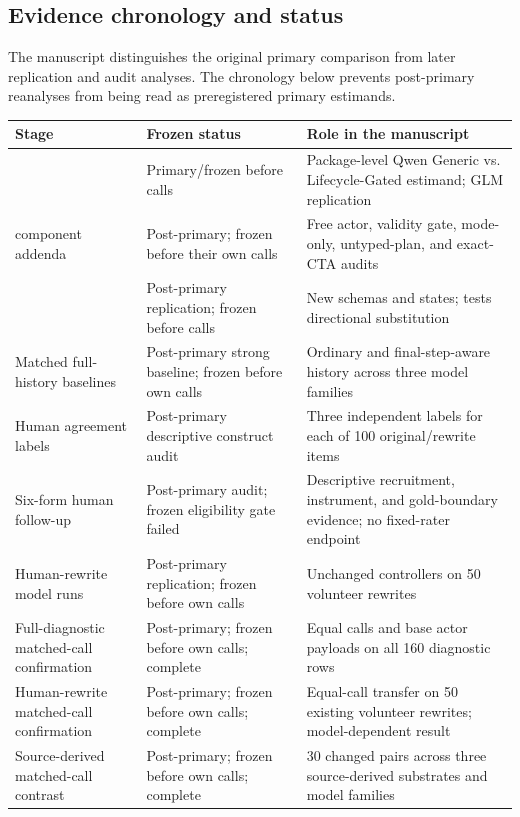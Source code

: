 \documentclass[10pt]{article}
\begin{document}
\subsection{Evidence chronology and status}
The manuscript distinguishes the original primary comparison from later replication and audit
analyses. The chronology below prevents post-primary reanalyses from being read as preregistered
primary estimands.

\begin{table}[H]
\centering
\small
\begin{tabular}{p{}p{}p{}}
\toprule
Stage & Frozen status & Role in the manuscript \\
\midrule
\PrimaryDiagnostic{} & Primary/frozen before calls & Package-level Qwen Generic vs. Lifecycle-Gated estimand; GLM replication \\
\PrimaryDiagnostic{} component addenda & Post-primary; frozen before their own calls & Free actor, validity gate, mode-only, untyped-plan, and exact-CTA audits \\
\NewSchemaReplication{} & Post-primary replication; frozen before calls & New schemas and states; tests directional substitution \\
Matched full-history baselines & Post-primary strong baseline; frozen before own calls & Ordinary and final-step-aware history across three model families \\
Human agreement labels & Post-primary descriptive construct audit & Three independent labels for each of 100 original/rewrite items \\
Six-form human follow-up & Post-primary audit; frozen eligibility gate failed & Descriptive recruitment, instrument, and gold-boundary evidence; no fixed-rater endpoint \\
Human-rewrite model runs & Post-primary replication; frozen before own calls & Unchanged controllers on 50 volunteer rewrites \\
Full-diagnostic matched-call confirmation & Post-primary; frozen before own calls; complete & Equal calls and base actor payloads on all 160 diagnostic rows \\
Human-rewrite matched-call confirmation & Post-primary; frozen before own calls; complete & Equal-call transfer on 50 existing volunteer rewrites; model-dependent result \\
Source-derived matched-call contrast & Post-primary; frozen before own calls; complete & 30 changed pairs across three source-derived substrates and model families \\

\end{tabular}
\end{table}
\end{document}
